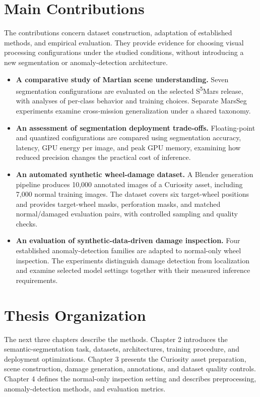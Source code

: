 \section{Main Contributions}

The contributions concern dataset construction, adaptation of established methods, and empirical evaluation. They provide evidence for choosing visual processing configurations under the studied conditions, without introducing a new segmentation or anomaly-detection architecture.

\begin{itemize}
    \item \textbf{A comparative study of Martian scene understanding.} Seven segmentation configurations are evaluated on the selected S\textsuperscript{5}Mars release, with analyses of per-class behavior and training choices. Separate MarsSeg experiments examine cross-mission generalization under a shared taxonomy.
    \item \textbf{An assessment of segmentation deployment trade-offs.} Floating-point and quantized configurations are compared using segmentation accuracy, latency, GPU energy per image, and peak GPU memory, examining how reduced precision changes the practical cost of inference.
    \item \textbf{An automated synthetic wheel-damage dataset.} A Blender generation pipeline produces 10,000 annotated images of a Curiosity asset, including 7,000 normal training images. The dataset covers six target-wheel positions and provides target-wheel masks, perforation masks, and matched normal/damaged evaluation pairs, with controlled sampling and quality checks.
    \item \textbf{An evaluation of synthetic-data-driven damage inspection.} Four established anomaly-detection families are adapted to normal-only wheel inspection. The experiments distinguish damage detection from localization and examine selected model settings together with their measured inference requirements.
\end{itemize}

\section{Thesis Organization}

The next three chapters describe the methods. Chapter 2  introduces the semantic-segmentation task, datasets, architectures, training procedure, and deployment optimizations. Chapter 3 presents the Curiosity asset preparation, scene construction, damage generation, annotations, and dataset quality controls. Chapter 4 defines the normal-only inspection setting and describes preprocessing, anomaly-detection methods, and evaluation metrics.

